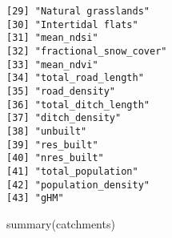 \documentclass[
]{article}
\newenvironment{Shaded}{\begin{snugshade}}{\end{snugshade}}
\newcommand{\FunctionTok}[1]{\textcolor[rgb]{0.28,0.35,0.67}{#1}}
\newcommand{\NormalTok}[1]{\textcolor[rgb]{0.00,0.23,0.31}{#1}}
\begin{document}
\begin{verbatim}
[29] "Natural grasslands"                                                                    
[30] "Intertidal flats"                                                                      
[31] "mean_ndsi"                                                                             
[32] "fractional_snow_cover"                                                                 
[33] "mean_ndvi"                                                                             
[34] "total_road_length"                                                                     
[35] "road_density"                                                                          
[36] "total_ditch_length"                                                                    
[37] "ditch_density"                                                                         
[38] "unbuilt"                                                                               
[39] "res_built"                                                                             
[40] "nres_built"                                                                            
[41] "total_population"                                                                      
[42] "population_density"                                                                    
[43] "gHM"                                                                                   
\end{verbatim}

\begin{Shaded}
\begin{Highlighting}[]
\FunctionTok{summary}\NormalTok{(catchments)}
\end{Highlighting}
\end{Shaded}
\end{document}
